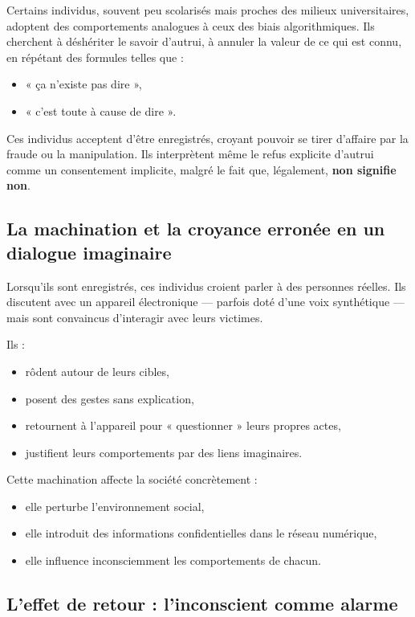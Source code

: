\documentclass[12pt,oneside]{article}
\begin{document}
Certains individus, souvent peu scolarisés mais proches des milieux universitaires, adoptent des comportements analogues à ceux des biais algorithmiques. Ils cherchent à déshériter le savoir d'autrui, à annuler la valeur de ce qui est connu, en répétant des formules telles que :
\begin{itemize}
    \item « ça n'existe pas dire »,  
    \item « c'est toute à cause de dire ».  
\end{itemize}

Ces individus acceptent d'être enregistrés, croyant pouvoir se tirer d'affaire par la fraude ou la manipulation. Ils interprètent même le refus explicite d'autrui comme un consentement implicite, malgré le fait que, légalement, \textbf{non signifie non}.

\subsection{La machination et la croyance erronée en un dialogue imaginaire}

Lorsqu'ils sont enregistrés, ces individus croient parler à des personnes réelles.  
Ils discutent avec un appareil électronique --- parfois doté d'une voix synthétique --- mais sont convaincus d'interagir avec leurs victimes.

Ils :
\begin{itemize}
    \item rôdent autour de leurs cibles,  
    \item posent des gestes sans explication,  
    \item retournent à l'appareil pour « questionner » leurs propres actes,  
    \item justifient leurs comportements par des liens imaginaires.  
\end{itemize}

Cette machination affecte la société concrètement :  
\begin{itemize}
    \item elle perturbe l'environnement social,  
    \item elle introduit des informations confidentielles dans le réseau numérique,  
    \item elle influence inconsciemment les comportements de chacun.  
\end{itemize}

\subsection{L'effet de retour : l'inconscient comme alarme}
\end{document}
